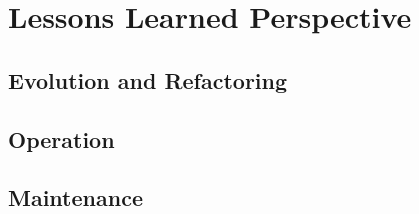 \section{Lessons Learned Perspective}

\subsection{Evolution and Refactoring}

\subsection{Operation}

\subsection{Maintenance}